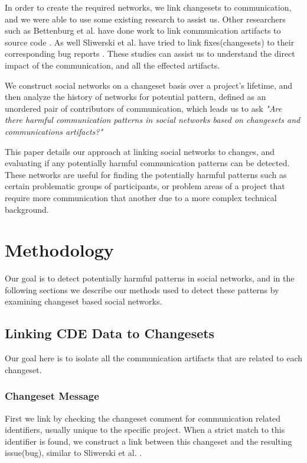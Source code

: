 \documentclass[conference]{IEEEtran}
\begin{document}
In order to create the required networks, we link changesets to communication, and we were able to use some existing research to assist us.  Other researchers such as Bettenburg et al. have done work to link communication artifacts to source code \cite{Bettenburg:2008:ESI:1370750.1370757}.  As well Sliwerski et al. have tried to link fixes(changesets) to their corresponding bug reports \cite{Sliwerski:2005:CIF:1083142.1083147}.  These studies can assist us to understand the direct impact of the communication, and all the effected artifacts.  

We construct social networks on a changeset basis over a project's lifetime, and then analyze the history of networks for potential pattern, defined as an unordered pair of contributors of communication, which leads us to ask \textit{"Are there harmful communication patterns in social networks based on changesets and communications artifacts?"} 

This paper details our approach at linking social networks to changes, and evaluating if any potentially harmful communication patterns can be detected.  These networks are useful for finding the potentially harmful patterns such as certain problematic groups of participants, or problem areas of a project that require more communication that another due to a more complex technical background. 

\section{Methodology}
Our goal is to detect potentially harmful patterns in social networks, and in the following sections we describe our methods used to detect these patterns by examining changeset based social networks.

\subsection{Linking CDE Data to Changesets}
Our goal here is to isolate all the communication artifacts that are related to each changeset.  
\subsubsection{Changeset Message}
First we link by checking the changeset comment for communication related identifiers, usually unique to the specific project.  When a strict match to this identifier is found, we construct a link between this changeset and the resulting issue(bug), similar to Sliwerski et al. \cite{Sliwerski:2005:CIF:1083142.1083147}.
\end{document}

